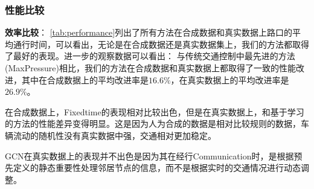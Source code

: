 \subsubsection{性能比较}

\textbf{效率比较}：
\autoref{tab:performance}列出了所有方法在合成数据和真实数据上路口的平均通行时间，可以看出，无论是在合成数据还是真实数据集上，我们的方法都取得了最好的表现。进一步的观察数据可以看出：
与传统交通控制中最先进的方法(MaxPressure)相比，我们的方法在合成数据和真实数据上都取得了一致的性能改进，其中在合成数据上的平均改进率是$16.6\%$，在真实数据上的平均改进率是$26.9\%$。

在合成数据上，Fixedtime的表现相对比较出色，但是在真实数据上，和基于学习的方法的性能差异变得明显。这是因为人为合成的数据是相对比较规则的数据，车辆流动的随机性没有真实数据中强，交通相对更加稳定。

GCN在真实数据上的表现并不出色是因为其在经行Communication时，是根据预先定义的静态重要性处理邻居节点的信息，而不是根据实时的交通情况进行动态调整。


